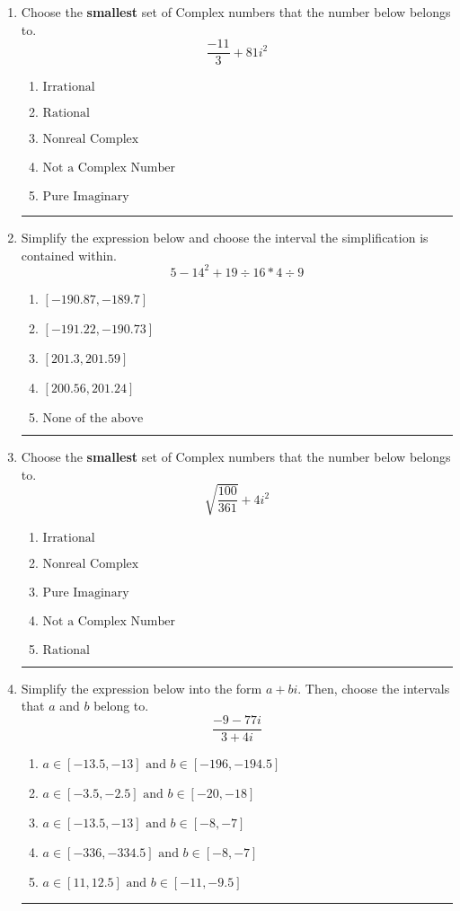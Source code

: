 \documentclass[14pt]{extbook}
\newcommand{\litem}[1]{\item#1\hspace*{-1cm}\rule{\textwidth}{0.4pt}}
\begin{document}
\begin{enumerate}
\litem{
Choose the \textbf{smallest} set of Complex numbers that the number below belongs to.\[ \frac{-11}{3}+81i^2 \]\begin{enumerate}[label=\Alph*.]
\item \( \text{Irrational} \)
\item \( \text{Rational} \)
\item \( \text{Nonreal Complex} \)
\item \( \text{Not a Complex Number} \)
\item \( \text{Pure Imaginary} \)

\end{enumerate} }
\litem{
Simplify the expression below and choose the interval the simplification is contained within.\[ 5 - 14^2 + 19 \div 16 * 4 \div 9 \]\begin{enumerate}[label=\Alph*.]
\item \( [-190.87, -189.7] \)
\item \( [-191.22, -190.73] \)
\item \( [201.3, 201.59] \)
\item \( [200.56, 201.24] \)
\item \( \text{None of the above} \)

\end{enumerate} }
\litem{
Choose the \textbf{smallest} set of Complex numbers that the number below belongs to.\[ \sqrt{\frac{100}{361}} + 4i^2 \]\begin{enumerate}[label=\Alph*.]
\item \( \text{Irrational} \)
\item \( \text{Nonreal Complex} \)
\item \( \text{Pure Imaginary} \)
\item \( \text{Not a Complex Number} \)
\item \( \text{Rational} \)

\end{enumerate} }
\litem{
Simplify the expression below into the form $a+bi$. Then, choose the intervals that $a$ and $b$ belong to.\[ \frac{-9 - 77 i}{3 + 4 i} \]\begin{enumerate}[label=\Alph*.]
\item \( a \in [-13.5, -13] \text{ and } b \in [-196, -194.5] \)
\item \( a \in [-3.5, -2.5] \text{ and } b \in [-20, -18] \)
\item \( a \in [-13.5, -13] \text{ and } b \in [-8, -7] \)
\item \( a \in [-336, -334.5] \text{ and } b \in [-8, -7] \)
\item \( a \in [11, 12.5] \text{ and } b \in [-11, -9.5] \)


\end{enumerate}}
\end{enumerate}
\end{document}
